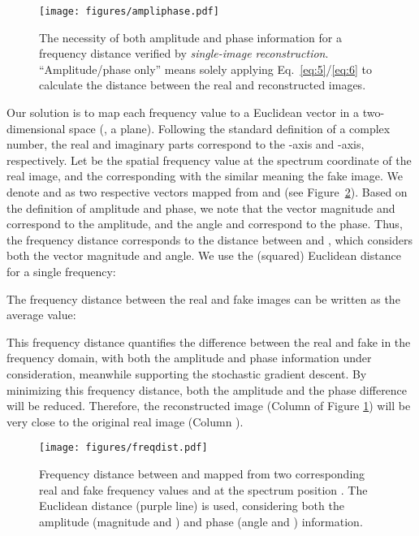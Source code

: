 \documentclass[10pt,twocolumn,letterpaper]{article}
\begin{document}
\begin{figure}[t]
	\centering
\texttt{[image: figures/ampliphase.pdf]}
\caption{The necessity of both amplitude and phase information for a frequency distance verified by \textit{single-image reconstruction}. ``Amplitude/phase only'' means solely applying Eq.~\eqref{eq:5}/\eqref{eq:6} to calculate the distance between the real and reconstructed images.}
	\label{fig:ampliphase}
	\vspace{-0.3cm}
\end{figure}




Our solution is to map each frequency value to a Euclidean vector in a two-dimensional space (\ie, a plane). Following the standard definition of a complex number, the real and imaginary parts correspond to the -axis and -axis, respectively.
Let  be the spatial frequency value at the spectrum coordinate  of the real image, and the corresponding  with the similar meaning \wrt the fake image.
We denote  and  as two respective vectors mapped from  and  (see Figure~\ref{fig:freqdist}).
Based on the definition of amplitude and phase, we note that the vector magnitude  and  correspond to the amplitude, and the angle  and  correspond to the phase.
Thus, the frequency distance corresponds to the distance between  and , which considers both the vector magnitude and angle.
We use the (squared) Euclidean distance for a single frequency:

The frequency distance between the real and fake images can be written as the average value: 



This frequency distance quantifies the difference between the real and fake in the frequency domain, with both the amplitude and phase information under consideration, meanwhile supporting the stochastic gradient descent.
By minimizing this frequency distance, both the amplitude and the phase difference will be reduced. Therefore, the reconstructed image (Column  of Figure \ref{fig:ampliphase}) will be very close to the original real image (Column ).
\fi


\begin{figure}[t]
	\centering
\texttt{[image: figures/freqdist.pdf]}
\caption{Frequency distance between  and  mapped from two corresponding real and fake frequency values  and  at the spectrum position . The Euclidean distance (purple line) is used, considering both the amplitude (magnitude  and ) and phase (angle  and ) information.}
	\label{fig:freqdist}
	\vspace{-0.2cm}
\end{figure}
\end{document}
